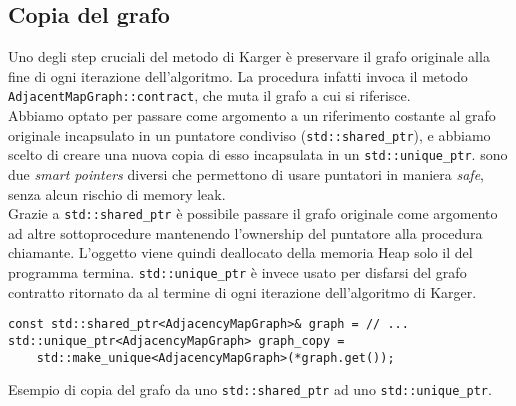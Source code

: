 

\subsection{Copia del grafo}
\label{sub:graph-copy}

\noindent Uno degli step cruciali del metodo di Karger è preservare il grafo originale alla fine di ogni iterazione dell'algoritmo. La procedura  infatti invoca il metodo \\ \texttt{AdjacentMapGraph::contract}, che muta il grafo a cui si riferisce. \\

\noindent Abbiamo optato per passare come argomento a  un riferimento costante al grafo originale incapsulato in un puntatore condiviso (\texttt{std::shared_ptr}), e abbiamo scelto di creare una nuova copia di esso incapsulata in un \texttt{std::unique_ptr}. sono due \textit{smart pointers} diversi che permettono di usare puntatori in maniera \textit{safe}, senza alcun rischio di memory leak. \\

\noindent Grazie a \texttt{std::shared_ptr} è possibile passare il grafo originale come argomento ad altre sottoprocedure mantenendo l'ownership del puntatore alla procedura chiamante. L'oggetto viene quindi deallocato della memoria Heap solo il  del programma termina. \texttt{std::unique_ptr} è invece usato per disfarsi del grafo contratto ritornato da  al termine di ogni iterazione dell'algoritmo di Karger.

\begin{listing}[!ht]
\begin{verbatim}
const std::shared_ptr<AdjacencyMapGraph>& graph = // ...
std::unique_ptr<AdjacencyMapGraph> graph_copy =
    std::make_unique<AdjacencyMapGraph>(*graph.get());
\end{verbatim}
\caption{Esempio di copia del grafo da uno \texttt{std::shared_ptr} ad uno \texttt{std::unique_ptr}.}
\label{listing:graph-copy}
\end{listing}

